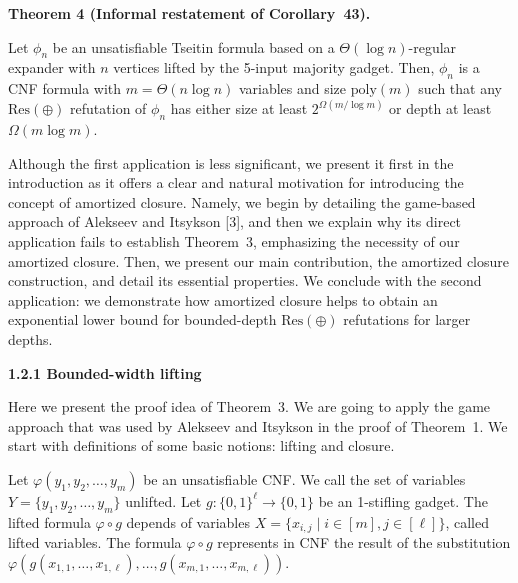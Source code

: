 \documentclass[10pt,a4paper]{article}
\begin{document}
\par\medskip\noindent\textbf{
Theorem 4 (Informal restatement of Corollary 43).
}\par



Let $\phi_{n}$ be an unsatisfiable Tseitin formula based on a $\Theta(\log n)$-regular expander with $n$ vertices lifted by the 5-input majority gadget. Then, $\phi_{n}$ is a CNF formula with $m=\Theta(n\log n)$ variables and size $\mathrm{poly}(m)$ such that any $\mathrm{Res}(\oplus)$ refutation of $\phi_{n}$ has either size at least $2^{\Omega(m/\log m)}$ or depth at least $\Omega(m\log m)$.\par




Although the first application is less significant, we present it first in the introduction as it offers a clear and natural motivation for introducing the concept of amortized closure.
Namely, we begin by detailing the game-based approach of Alekseev and Itsykson [3], and then we explain why its direct application fails to establish Theorem 3, emphasizing the necessity of our amortized closure. Then, we present our main contribution, the amortized closure construction, and detail its essential properties. We conclude with the second application: we demonstrate how amortized closure helps to obtain an exponential lower bound for bounded-depth $\mathrm{Res}(\oplus)$ refutations for larger depths.\par


\par\medskip\noindent\textbf{
1.2.1 Bounded-width lifting}\par


Here we present the proof idea of Theorem 3. We are going to apply the game approach that was used by Alekseev and Itsykson in the proof of Theorem 1. We start with definitions of some basic notions: lifting and closure.\par



Let $\varphi(y_{1},y_{2},\dots,y_{m})$ be an unsatisfiable CNF. We call the set of variables
$Y=\{y_{1},y_{2},\dots,y_{m}\}$ unlifted. Let $g\colon\{0,1\}^{\ell}\to\{0,1\}$ be an 1-stifling gadget. The lifted formula $\varphi\circ g$ depends of variables $X=\{x_{i,j}\mid i\in[m],j\in[\ell]\}$, called lifted variables. The formula $\varphi\circ g$ represents in CNF the result of the substitution $\varphi(g(x_{1,1},\dots,x_{1,\ell}),\dots,g(x_{m,1},\dots,x_{m,\ell}))$.\par
\end{document}
